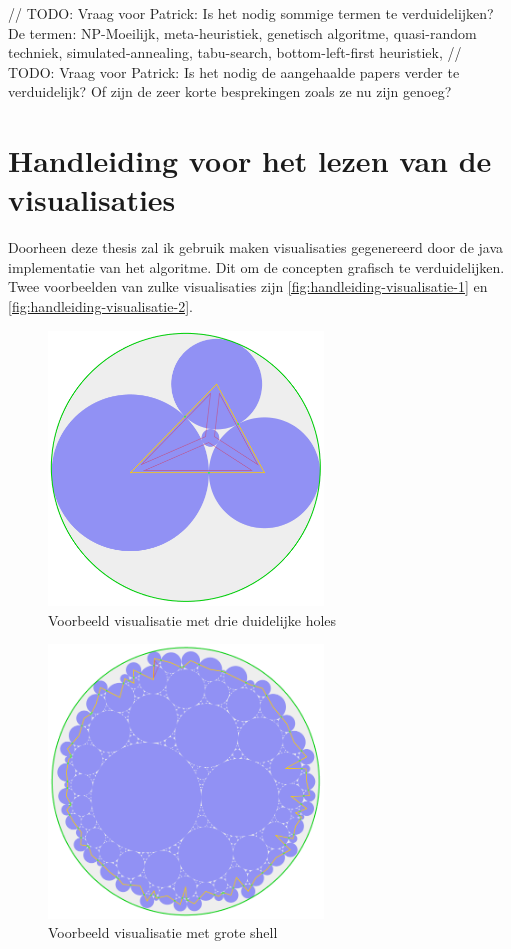 \documentclass[12pt,a4paper,oneside]{book}
\begin{document}
// TODO: Vraag voor Patrick: Is het nodig sommige termen te verduidelijken? De termen: NP-Moeilijk, meta-heuristiek, genetisch algoritme, quasi-random techniek, simulated-annealing, tabu-search, bottom-left-first heuristiek, 
// TODO: Vraag voor Patrick: Is het nodig de aangehaalde papers verder te verduidelijk? Of zijn de zeer korte besprekingen zoals ze nu zijn genoeg?

\chapter{Handleiding voor het lezen van de visualisaties} \label{chap:handleiding-visualisaties}

Doorheen deze thesis zal ik gebruik maken visualisaties gegenereerd door de java implementatie van het algoritme.
Dit om de concepten grafisch te verduidelijken.
Twee voorbeelden van zulke visualisaties zijn \autoref{fig:handleiding-visualisatie-1} en \autoref{fig:handleiding-visualisatie-2}.

\begin{figure}
  \centering
  \includegraphics[width=0.65\textwidth]{handleiding-visualisatie-1.png}
  \caption{Voorbeeld visualisatie met drie duidelijke holes} \label{fig:handleiding-visualisatie-1}
\end{figure}

\begin{figure}
  \centering
  \includegraphics[width=0.65\textwidth]{handleiding-visualisatie-2.png}
  \caption{Voorbeeld visualisatie met grote shell} \label{fig:handleiding-visualisatie-2}
\end{figure}
\end{document}
